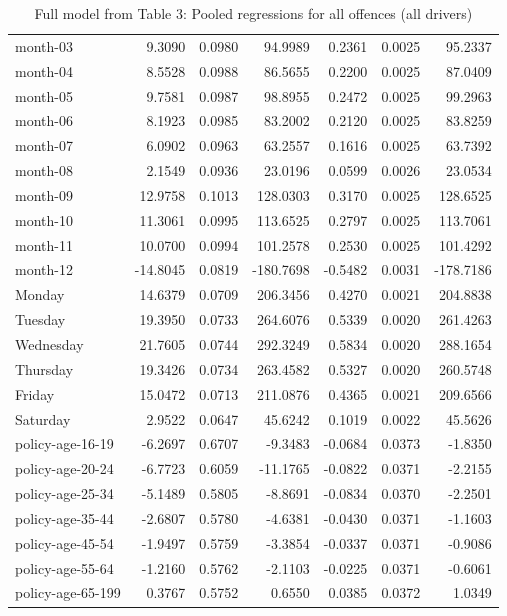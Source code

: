 \documentclass[10pt]{article}
\begin{document}
\begin{table}[ht]
\begin{tabular}{lrrrrrr}
  month-03 & 9.3090 & 0.0980 & 94.9989 & 0.2361 & 0.0025 & 95.2337 \\ 
  month-04 & 8.5528 & 0.0988 & 86.5655 & 0.2200 & 0.0025 & 87.0409 \\ 
  month-05 & 9.7581 & 0.0987 & 98.8955 & 0.2472 & 0.0025 & 99.2963 \\ 
  month-06 & 8.1923 & 0.0985 & 83.2002 & 0.2120 & 0.0025 & 83.8259 \\ 
  month-07 & 6.0902 & 0.0963 & 63.2557 & 0.1616 & 0.0025 & 63.7392 \\ 
  month-08 & 2.1549 & 0.0936 & 23.0196 & 0.0599 & 0.0026 & 23.0534 \\ 
  month-09 & 12.9758 & 0.1013 & 128.0303 & 0.3170 & 0.0025 & 128.6525 \\ 
  month-10 & 11.3061 & 0.0995 & 113.6525 & 0.2797 & 0.0025 & 113.7061 \\ 
  month-11 & 10.0700 & 0.0994 & 101.2578 & 0.2530 & 0.0025 & 101.4292 \\ 
  month-12 & -14.8045 & 0.0819 & -180.7698 & -0.5482 & 0.0031 & -178.7186 \\ 
  Monday & 14.6379 & 0.0709 & 206.3456 & 0.4270 & 0.0021 & 204.8838 \\ 
  Tuesday & 19.3950 & 0.0733 & 264.6076 & 0.5339 & 0.0020 & 261.4263 \\ 
  Wednesday & 21.7605 & 0.0744 & 292.3249 & 0.5834 & 0.0020 & 288.1654 \\ 
  Thursday & 19.3426 & 0.0734 & 263.4582 & 0.5327 & 0.0020 & 260.5748 \\ 
  Friday & 15.0472 & 0.0713 & 211.0876 & 0.4365 & 0.0021 & 209.6566 \\ 
  Saturday & 2.9522 & 0.0647 & 45.6242 & 0.1019 & 0.0022 & 45.5626 \\ 
  policy-age-16-19 & -6.2697 & 0.6707 & -9.3483 & -0.0684 & 0.0373 & -1.8350 \\ 
  policy-age-20-24 & -6.7723 & 0.6059 & -11.1765 & -0.0822 & 0.0371 & -2.2155 \\ 
  policy-age-25-34 & -5.1489 & 0.5805 & -8.8691 & -0.0834 & 0.0370 & -2.2501 \\ 
  policy-age-35-44 & -2.6807 & 0.5780 & -4.6381 & -0.0430 & 0.0371 & -1.1603 \\ 
  policy-age-45-54 & -1.9497 & 0.5759 & -3.3854 & -0.0337 & 0.0371 & -0.9086 \\ 
  policy-age-55-64 & -1.2160 & 0.5762 & -2.1103 & -0.0225 & 0.0371 & -0.6061 \\ 
  policy-age-65-199 & 0.3767 & 0.5752 & 0.6550 & 0.0385 & 0.0372 & 1.0349 \\ 
   \hline
\end{tabular}
\caption{Full model from Table 3: Pooled regressions for all offences (all drivers)} 
\label{tab_3_all_pts_A}
\end{table}
\end{document}
